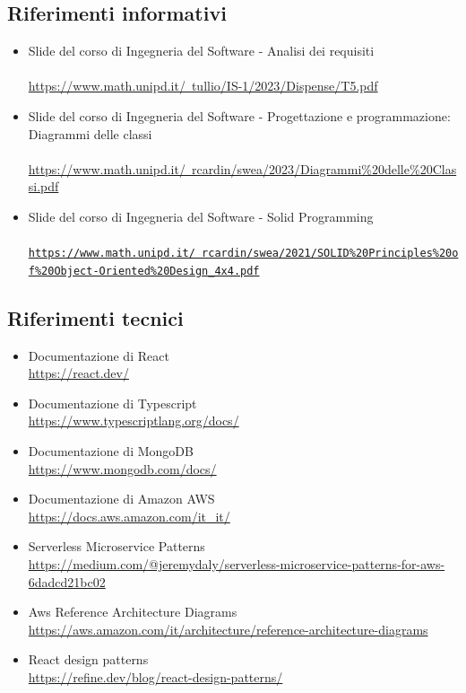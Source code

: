 \documentclass{article}
\begin{document}
\subsection{Riferimenti informativi}
\begin{itemize}
    \item Slide del corso di Ingegneria del Software - Analisi dei requisiti \\ \\
    \href{https://www.math.unipd.it/~tullio/IS-1/2023/Dispense/T5.pdf}{https://www.math.unipd.it/~tullio/IS-1/2023/Dispense/T5.pdf}
    \item Slide del corso di Ingegneria del Software - Progettazione e programmazione: Diagrammi delle classi \\ \\
\href{https://www.math.unipd.it/~rcardin/swea/2023/Diagrammi%20delle%20Classi.pdf}{https://www.math.unipd.it/~rcardin/swea/2023/Diagrammi\%20delle\%20Classi.pdf}
    \item Slide del corso di Ingegneria del Software - Solid Programming \\ \\
\href{https://www.math.unipd.it/~rcardin/swea/2021/SOLID\%20Principles\%20of\%20Object-Oriented\%20Design_4x4.pdf}{\texttt{https://www.math.unipd.it/~rcardin/swea/2021/SOLID\%20Principles\%20of\%20Object-Oriented\%20Design\_4x4.pdf}}
\end{itemize}
\subsection{Riferimenti tecnici}
\begin{itemize}
\item Documentazione di React \\ \href{ https://react.dev/}{ https://react.dev/}
\item Documentazione di Typescript \\ \href{https://www.typescriptlang.org/docs/}{https://www.typescriptlang.org/docs/}
\item Documentazione di MongoDB \\ \href{https://www.mongodb.com/docs/}{https://www.mongodb.com/docs/}
\item Documentazione di Amazon AWS \\ \href{https://docs.aws.amazon.com/it_it/}{https://docs.aws.amazon.com/it\_it/}
\item Serverless Microservice Patterns \\\href{https://medium.com/@jeremydaly/serverless-microservice-patterns-for-aws-6dadcd21bc02}{https://medium.com/@jeremydaly/serverless-microservice-patterns-for-aws-6dadcd21bc02}
\item Aws Reference Architecture Diagrams \\ \href{https://aws.amazon.com/it/architecture/reference-architecture-diagrams}{https://aws.amazon.com/it/architecture/reference-architecture-diagrams}
\item React design patterns \\ \href{https://refine.dev/blog/react-design-patterns/}{https://refine.dev/blog/react-design-patterns/}
\end{itemize}
\end{document}
